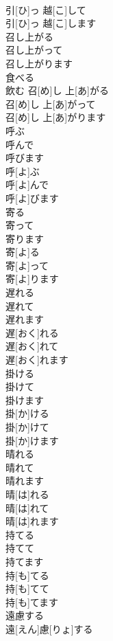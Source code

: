 \documentclass[8pt]{extreport}
\begin{document}
\begin{CJK}{UTF8}{min}
\\	引[ひ]っ 越[こ]して 
\\	引[ひ]っ 越[こ]します	
\\	召し上がる 
\\	召し上がって 
\\	召し上がります	
\\	食べる 
\\	飲む	召[め]し 上[あ]がる 
\\	召[め]し 上[あ]がって 
\\	召[め]し 上[あ]がります	
\\	呼ぶ 
\\	呼んで 
\\	呼びます	
\\	呼[よ]ぶ 
\\	呼[よ]んで 
\\	呼[よ]びます	
\\	寄る 
\\	寄って 
\\	寄ります	
\\	寄[よ]る 
\\	寄[よ]って 
\\	寄[よ]ります	
\\	遅れる 
\\	遅れて 
\\	遅れます	
\\	遅[おく]れる 
\\	遅[おく]れて 
\\	遅[おく]れます	
\\	掛ける 
\\	掛けて 
\\	掛けます	
\\	掛[か]ける 
\\	掛[か]けて 
\\	掛[か]けます	
\\	晴れる 
\\	晴れて 
\\	晴れます	
\\	晴[は]れる 
\\	晴[は]れて 
\\	晴[は]れます	
\\	持てる 
\\	持てて 
\\	持てます	
\\	持[も]てる 
\\	持[も]てて 
\\	持[も]てます	
\\	遠慮する	
\\	遠[えん]慮[りょ]する	

\end{CJK}
\end{document}
